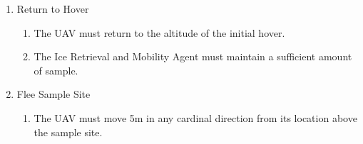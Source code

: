 \begin{enumerate}[noitemsep, label=\arabic*.]
\begin{enumerate}[noitemsep, label=4.\arabic*.]
\begin{enumerate}[noitemsep, label=4.1.\arabic*.]
					\end{enumerate}
				\item Return to Hover
					\begin{enumerate}[noitemsep, label=4.2.\arabic*.]
						\item The UAV must return to the altitude of the initial hover.
						\item The Ice Retrieval and Mobility Agent must maintain a sufficient amount of sample.
					\end{enumerate}
				\item Flee Sample Site
					\begin{enumerate}[noitemsep, label=4.3.\arabic*.]
						\item The UAV must move 5m in any cardinal direction from its location above the sample site.
					\end{enumerate}
			\end{enumerate}
		\end{enumerate}
